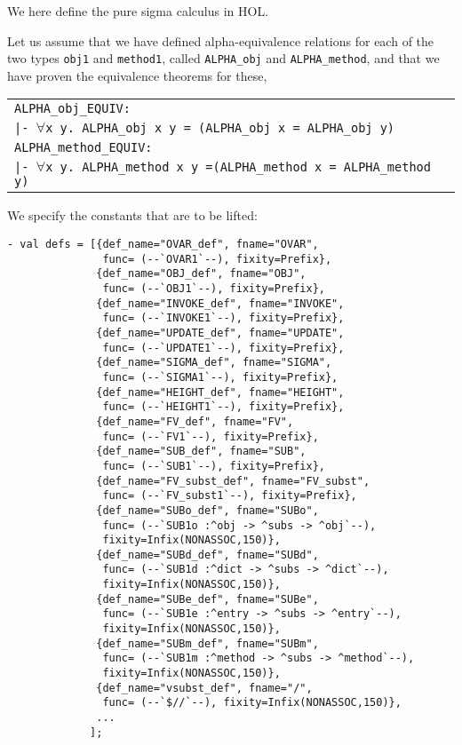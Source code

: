 \documentclass[envcountsame,runningheads]{llncs}
\begin{document}
We here define the pure sigma calculus in HOL.

Let us assume
that we have defined alpha-equivalence relations for each of the two types
{\tt obj1}
and {\tt method1}, called
{\tt ALPHA\_obj}
and {\tt ALPHA\_method},
and that we have proven the
equivalence theorems for these,
\begin{center}
\begin{tabular}{l}
{\tt ALPHA\_obj\_EQUIV:} \\
\hspace{0.9cm}
{\tt |- $\forall$x y. ALPHA\_obj x y = (ALPHA\_obj x = ALPHA\_obj y)} \\
{\tt ALPHA\_method\_EQUIV:} \\
\hspace{0.9cm}
{\tt |- $\forall$x y. ALPHA\_method x y =\;(ALPHA\_method x = ALPHA\_method y)}
\end{tabular}
\end{center}

We specify the constants that are to be lifted:
\begin{verbatim}
- val defs = [{def_name="OVAR_def", fname="OVAR",
               func= (--`OVAR1`--), fixity=Prefix},
              {def_name="OBJ_def", fname="OBJ",
               func= (--`OBJ1`--), fixity=Prefix},
              {def_name="INVOKE_def", fname="INVOKE",
               func= (--`INVOKE1`--), fixity=Prefix},
              {def_name="UPDATE_def", fname="UPDATE",
               func= (--`UPDATE1`--), fixity=Prefix},
              {def_name="SIGMA_def", fname="SIGMA",
               func= (--`SIGMA1`--), fixity=Prefix},
              {def_name="HEIGHT_def", fname="HEIGHT",
               func= (--`HEIGHT1`--), fixity=Prefix},
              {def_name="FV_def", fname="FV",
               func= (--`FV1`--), fixity=Prefix},
              {def_name="SUB_def", fname="SUB",
               func= (--`SUB1`--), fixity=Prefix},
              {def_name="FV_subst_def", fname="FV_subst",
               func= (--`FV_subst1`--), fixity=Prefix},
              {def_name="SUBo_def", fname="SUBo",
               func= (--`SUB1o :^obj -> ^subs -> ^obj`--),
               fixity=Infix(NONASSOC,150)},
              {def_name="SUBd_def", fname="SUBd",
               func= (--`SUB1d :^dict -> ^subs -> ^dict`--),
               fixity=Infix(NONASSOC,150)},
              {def_name="SUBe_def", fname="SUBe",
               func= (--`SUB1e :^entry -> ^subs -> ^entry`--),
               fixity=Infix(NONASSOC,150)},
              {def_name="SUBm_def", fname="SUBm",
               func= (--`SUB1m :^method -> ^subs -> ^method`--),
               fixity=Infix(NONASSOC,150)},
              {def_name="vsubst_def", fname="/",
               func= (--`$//`--), fixity=Infix(NONASSOC,150)},
              ...
             ];
\end{verbatim}
\end{document}
